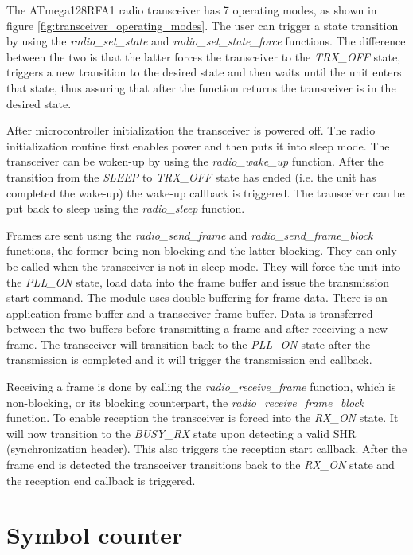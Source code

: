 The \mbox{ATmega128RFA1} radio transceiver has 7 operating modes, as shown in
figure \ref{fig:transceiver_operating_modes}. The user can trigger a state
transition by using the \emph{radio\_set\_state} and
\emph{radio\_set\_state\_force} functions. The difference between the two is
that the latter forces the transceiver to the \emph{TRX\_OFF} state, triggers a
new transition to the desired state and then waits until the unit enters that
state, thus assuring that after the function returns the transceiver is in the
desired state.

After microcontroller initialization the transceiver is powered off. The radio
initialization routine first enables power and then puts it into sleep mode.
The transceiver can be woken-up by using the \emph{radio\_wake\_up} function.
After the transition from the \emph{SLEEP} to \emph{TRX\_OFF} state has ended
(i.e. the unit has completed the wake-up) the wake-up callback is triggered.
The transceiver can be put back to sleep using the \emph{radio\_sleep}
function.

Frames are sent using the \emph{radio\_send\_frame} and
\emph{radio\_send\_frame\_block} functions, the former being non-blocking and
the latter blocking. They can only be called when the transceiver is not in
sleep mode. They will force the unit into the \emph{PLL\_ON} state, load data
into the frame buffer and issue the transmission start command. The module uses
double-buffering for frame data. There is an application frame buffer and a
transceiver frame buffer. Data is transferred between the two buffers before
transmitting a frame and after receiving a new frame. The transceiver will
transition back to the \emph{PLL\_ON} state after the transmission is
completed and it will trigger the transmission end callback.

Receiving a frame is done by calling the \emph{radio\_receive\_frame} function,
which is non-blocking, or its blocking counterpart,
the \emph{radio\_receive\_frame\_block} function. To enable reception the
transceiver is forced into the \emph{RX\_ON} state. It will now transition to
the \emph{BUSY\_RX} state upon detecting a valid SHR (synchronization header).
This also triggers the reception start callback. After the frame end is
detected the transceiver transitions back to the \emph{RX\_ON} state and the
reception end callback is triggered.

\section{Symbol counter}

